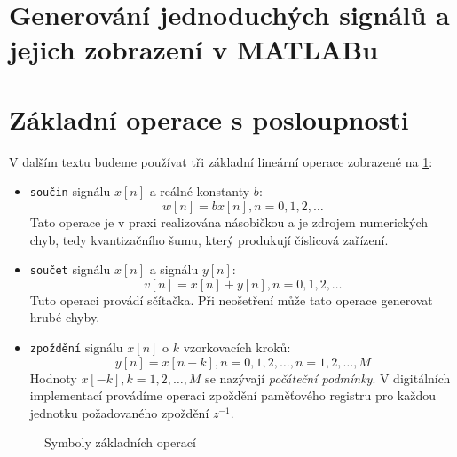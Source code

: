   \section{Generování jednoduchých signálů a jejich zobrazení v MATLABu}
    

  \section{Základní operace s posloupnosti}
    V dalším textu budeme používat tři základní lineární operace zobrazené na \ref{tky:fig_007}:
    \begin{itemize}
      \item \texttt{součin} signálu $x[n]$ a reálné konstanty $b$:
            $$w[n]=bx[n], n = 0,1,2, \ldots$$ Tato operace je v praxi realizována násobičkou a je
            zdrojem numerických chyb, tedy kvantizačního šumu, který produkují číslicová zařízení.
      \item \texttt{součet} signálu $x[n]$ a signálu $y[n]$:
            $$v[n]=x[n]+y[n], n = 0,1,2, \ldots$$ Tuto operaci provádí sčítačka. Při neošetření může
            tato operace generovat hrubé chyby.
      \item \texttt{zpoždění} signálu $x[n]$ o $k$ vzorkovacích kroků:  
            $$y[n]=x[n-k], n = 0,1,2, \ldots, n = 1,2, \ldots, M $$  Hodnoty $x[-k], k = 1, 2,
            \ldots, M$ se nazývají \emph{počáteční podmínky}. V digitálních implementací provádíme
            operaci zpoždění paměťového registru pro každou jednotku požadovaného zpoždění $z^{-1}$.
    \end{itemize}

    \begin{figure}[ht!]
      \centering
        \newline
      \caption[Základní operace]{Symboly základních operací \cite[s.~7]{Sovka2002}} 
      \label{tky:fig_007}
    \end{figure}

